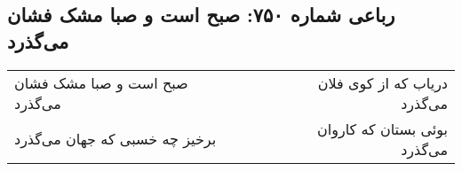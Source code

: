 \begin{center}
\section*{رباعی شماره ۷۵۰: صبح است و صبا مشک فشان می‌گذرد}
\label{sec:0750}
\begin{longtable}{l p{0.5cm} r}
صبح است و صبا مشک فشان می‌گذرد
&&
دریاب که از کوی فلان می‌گذرد
\\
برخیز چه خسبی که جهان می‌گذرد
&&
بوئی بستان که کاروان می‌گذرد
\\
\end{longtable}
\end{center}
